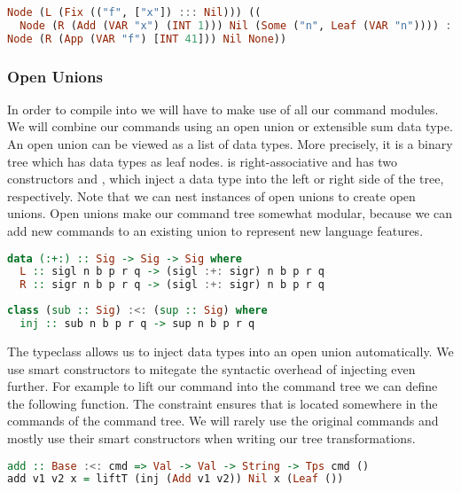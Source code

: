 \begin{lstlisting}[language=Haskell]
Node (L (Fix (("f", ["x"]) ::: Nil))) ((
  Node (R (Add (VAR "x") (INT 1))) Nil (Some ("n", Leaf (VAR "n")))) ::: Nil) (Some ("",
Node (R (App (VAR "f") [INT 41])) Nil None))
\end{lstlisting}

\subsubsection{\label{subsection:openunion}Open Unions}
In order to compile  into  we will have to make use of all our command modules. We will combine our commands using an open union or extensible sum data type. An open union can be viewed as a list of data types. More precisely, it is a binary tree which has data types as leaf nodes. \icode{:+:} is right-associative and has two constructors  and , which inject a data type into the left or right side of the tree, respectively. Note that we can nest instances of open unions to create open unions. Open unions make our command tree somewhat modular, because we can add new commands to an existing union to represent new language features.

\begin{lstlisting}[language=Haskell]
data (:+:) :: Sig -> Sig -> Sig where
  L :: sigl n b p r q -> (sigl :+: sigr) n b p r q
  R :: sigr n b p r q -> (sigl :+: sigr) n b p r q
\end{lstlisting}

\begin{lstlisting}[language=Haskell]
class (sub :: Sig) :<: (sup :: Sig) where
  inj :: sub n b p r q -> sup n b p r q
\end{lstlisting}

The typeclass \icode{:<:} allows us to inject data types into an open union automatically. We use smart constructors to mitegate the syntactic overhead of injecting \autocite{DBLP:conf/haskell/WuSH14, DBLP:conf/popl/LiangHJ95} even further. For example to lift our  command into the command tree we can define the following function. The constraint  ensures that  is located somewhere in the commands of the command tree. We will rarely use the original commands and mostly use their smart constructors when writing our tree transformations.

\begin{lstlisting}[language=Haskell]
add :: Base :<: cmd => Val -> Val -> String -> Tps cmd ()
add v1 v2 x = liftT (inj (Add v1 v2)) Nil x (Leaf ())
\end{lstlisting}

